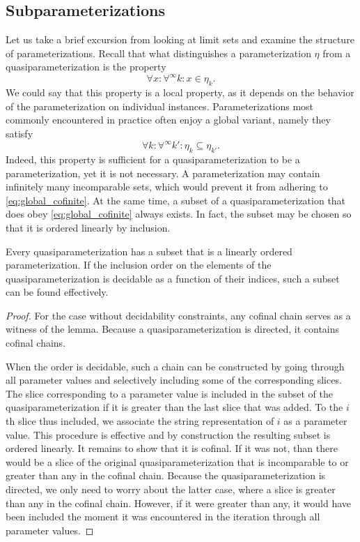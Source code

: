 \subsection{Subparameterizations}
Let us take a brief excursion from looking at limit sets and examine the structure of parameterizations.
Recall that what distinguishes a parameterization $\eta$ from a quasiparameterization is the property
\begin{equation*}
  \forall x\colon \forall^\infty k\colon x \in \eta_k.
\end{equation*}
We could say that this property is a local property, as it depends on the behavior of the parameterization on individual instances.
Parameterizations most commonly encountered in practice \parencite{niedermeier2006invitation} often enjoy a global variant, namely they satisfy
\begin{equation}
\label{eq:global_cofinite}
  \forall k\colon \forall^\infty k'\colon \eta_k \subseteq \eta_{k'}.
\end{equation}
Indeed, this property is sufficient for a quasiparameterization to be a parameterization, yet it is not necessary.
A parameterization may contain infinitely many incomparable sets, which would prevent it from adhering to \eqref{eq:global_cofinite}.
At the same time, a subset of a quasiparameterization that does obey \eqref{eq:global_cofinite} always exists.
In fact, the subset may be chosen so that it is ordered linearly by inclusion.
\begin{lemma}
\label{lem:cofinal_chain}
  Every quasiparameterization has a subset that is a linearly ordered parameterization.
  If the inclusion order on the elements of the quasiparameterization is decidable as a function of their indices, such a subset can be found effectively.
\end{lemma}
\begin{proof}
  For the case without decidability constraints, any cofinal chain \parencite{abramsky1994domain} serves as a witness of the lemma.
  Because a quasiparameterization is directed, it contains cofinal chains.

  When the order is decidable, such a chain can be constructed by going through all parameter values and selectively including some of the corresponding slices.
  The slice corresponding to a parameter value is included in the subset of the quasiparameterization if it is greater than the last slice that was added.
  To the $i$th slice thus included, we associate the string representation of $i$ as a parameter value.
  This procedure is effective and by construction the resulting subset is ordered linearly.
  It remains to show that it is cofinal.
  If it was not, than there would be a slice of the original quasiparameterization that is incomparable to or greater than any in the cofinal chain.
  Because the quasiparameterization is directed, we only need to worry about the latter case, where a slice is greater than any in the cofinal chain.
  However, if it were greater than any, it would have been included the moment it was encountered in the iteration through all parameter values.
\end{proof}

